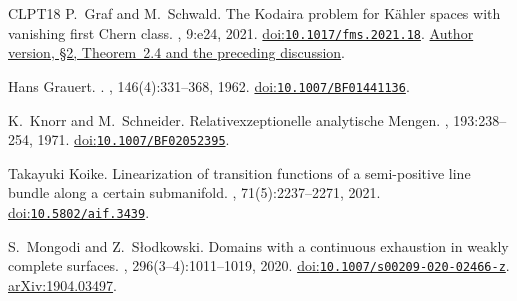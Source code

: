 \documentclass[11pt]{amsart}
\theoremstyle{definition}
\theoremstyle{remark}
\numberwithin{equation}{section}
\begin{document}
\begin{thebibliography}{CLPT18}
P.~Graf and M.~Schwald.
\newblock The {Kodaira} problem for {K\"ahler} spaces with vanishing
first {Chern} class.
, 9:e24, 2021.
\newblock
\href{https://doi.org/10.1017/fms.2021.18}
{doi:\nolinkurl{10.1017/fms.2021.18}}.
\href{https://arxiv.org/abs/2001.06339v2}
{Author version, \S2, Theorem~2.4 and the preceding discussion}.

Hans Grauert.
.
, 146(4):331--368, 1962.
\newblock \href{https://doi.org/10.1007/BF01441136}{doi:\nolinkurl{10.1007/BF01441136}}.


K.~Knorr and M.~Schneider.
\newblock Relativexzeptionelle analytische Mengen.
, 193:238--254, 1971.
\newblock
\href{https://doi.org/10.1007/BF02052395}
{doi:\nolinkurl{10.1007/BF02052395}}.


Takayuki Koike.
\newblock Linearization of transition functions of a semi-positive line bundle along a certain submanifold.
, 71(5):2237--2271, 2021.
\newblock \href{https://doi.org/10.5802/aif.3439}{doi:\nolinkurl{10.5802/aif.3439}}.


S.~Mongodi and Z.~S{\l}odkowski.
\newblock Domains with a continuous exhaustion in weakly complete surfaces.
, 296(3--4):1011--1019, 2020.
\newblock \href{https://doi.org/10.1007/s00209-020-02466-z}{doi:\nolinkurl{10.1007/s00209-020-02466-z}}. \href{https://arxiv.org/abs/1904.03497}{arXiv:1904.03497}.


\end{thebibliography}
\end{document}
